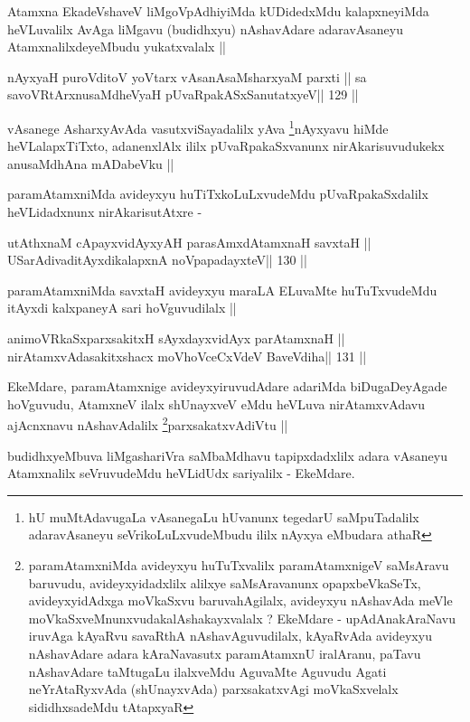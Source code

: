 \begin{artha}
Atamxna EkadeVshaveV liMgoVpAdhiyiMda kUDidedxMdu kalapxneyiMda
heVLuvalilx AvAga liMgavu (budidhxyu) nAshavAdare adaravAsaneyu
AtamxnalilxdeyeMbudu yukatxvalalx ||
\end{artha}

\begin{shl}
nAyxyaH puroVditoV yoV\s tarx vAsanAsaMsharxyaM parxti ||
sa savoVR\s tArxnusaMdheVyaH pUvaRpakASxSanutatxyeV\hfill || 129 ||
\end{shl}

\begin{artha}
vAsanege AsharxyAvAda vasutxviSayadalilx yAva \footnote[1]{hU
  muMtAdavugaLa vAsanegaLu hUvanunx tegedarU saMpuTadalilx
  adaravAsaneyu seVrikoLuLxvudeMbudu ililx nAyxya eMbudara athaR}nAyxyavu
hiMde heVLalapxTiTxto, adanenxlAlx ililx pUvaRpakaSxvanunx
nirAkarisuvudukekx anusaMdhAna mADabeVku ||
\end{artha}

\begin{artha}
paramAtamxniMda avideyxyu huTiTxkoLuLxvudeMdu pUvaRpakaSxdalilx
heVLidadxnunx nirAkarisutAtxre -
\end{artha}

\begin{shl}
utAthxnaM cApayxvidAyxyAH parasAmxdAtamxnaH savxtaH ||
USarAdivaditAyxdikalapxnA noVpapadayxteV\hfill || 130 ||
\end{shl}

\begin{artha}
paramAtamxniMda savxtaH avideyxyu maraLA ELuvaMte huTuTxvudeMdu
itAyxdi kalxpaneyA sari hoVguvudilalx ||
\end{artha}

\begin{shl}
animoVRkaSxparxsakitxH sAyxdayxvidAyx parAtamxnaH ||
nirAtamxvAdasakitxshacx moVhoVceCxVdeV BaveVdiha\hfill || 131 ||
\end{shl}

\begin{artha}
EkeMdare, paramAtamxnige avideyxyiruvudAdare adariMda biDugaDeyAgade
hoVguvudu, AtamxneV ilalx shUnayxveV eMdu heVLuva nirAtamxvAdavu
ajAcnxnavu nAshavAdalilx \footnote[1]{paramAtamxniMda avideyxyu
  huTuTxvalilx paramAtamxnigeV saMsAravu baruvudu, avideyxyidadxlilx
  alilxye saMsAravanunx opapxbeVkaSeTx, avideyxyidAdxga moVkaSxvu
  baruvahAgilalx, avideyxyu nAshavAda meVle
  moVkaSxveMnunxvudakalAshakayxvalalx ? EkeMdare - upAdAnakAraNavu
  iruvAga kAyaRvu savaRthA nAshavAguvudilalx, kAyaRvAda avideyxyu
  nAshavAdare adara kAraNavasutx paramAtamxnU iralAranu, paTavu
  nAshavAdare taMtugaLu ilalxveMdu AguvaMte Aguvudu Agati
  neYrAtaRyxvAda (shUnayxvAda) parxsakatxvAgi moVkaSxvelalx
  sididhxsadeMdu tAtapxyaR}parxsakatxvAdiVtu ||

budidhxyeMbuva liMgashariVra saMbaMdhavu tapipxdadxlilx adara vAsaneyu
Atamxnalilx seVruvudeMdu heVLidUdx sariyalilx - EkeMdare.
\end{artha}


